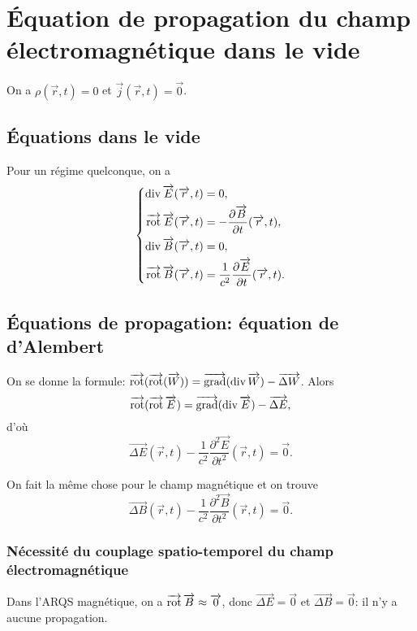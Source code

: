\section{Équation de propagation du champ électromagnétique dans le vide}

On a $\rho(\vec{r},t)=0$ et $\vec{j}(\vec{r},t)=\vec{0}$.

\subsection{Équations dans le vide}

Pour un régime quelconque, on a 
\begin{equation}
    \left\lbrace
        \begin{aligned}
            \div\vec{E}(\vec{r},t)&=0,\\
            \vecrot\vec{E}(\vec{r},t)&=-\frac{\partial\vec{B}}{\partial t}(\vec{r},t),\\
            \div\vec{B}(\vec{r},t)&=0,\\
            \vecrot\vec{B}(\vec{r},t)&=\frac{1}{c^{2}}\frac{\partial\vec{E}}{\partial t}(\vec{r},t).
        \end{aligned}
    \right.
\end{equation}

\subsection{Équations de propagation: équation de d'Alembert}

On se donne la formule: $\vecrot(\vecrot(\vec{W}))=\vecgrad(\div\vec{W})-\vec{\Delta W}$. Alors
\begin{equation}
    \vecrot(\vecrot\vec{E})=\vecgrad(\div\vec{E})-\vec{\Delta E},
\end{equation}
d'où
\begin{equation}
    \boxed{
        \vec{\Delta E}(\vec{r},t)-\frac{1}{c^{2}}\frac{\partial^{2}\vec{E}}{\partial t^{2}}(\vec{r},t)=\vec{0}.
    }
\end{equation}

On fait la même chose pour le champ magnétique et on trouve
\begin{equation}
    \boxed{
        \vec{\Delta B}(\vec{r},t)-\frac{1}{c^{2}}\frac{\partial^{2}\vec{B}}{\partial t^{2}}(\vec{r},t)=\vec{0}.
    }
\end{equation}

\subsubsection{Nécessité du couplage spatio-temporel du champ électromagnétique}

Dans l'ARQS magnétique, on a $\vecrot\vec{B}\approx\vec{0}$, donc $\vec{\Delta E}=\vec{0}$ et $\vec{\Delta B}=\vec{0}$: il n'y a aucune propagation.